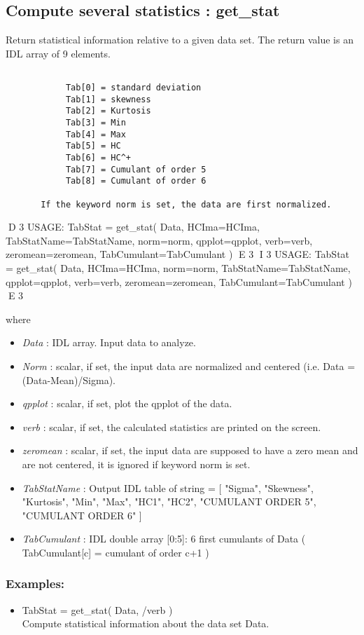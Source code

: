 \subsection{Compute several statistics : get\_stat}
Return statistical information relative to a given data set. The return value is an IDL array of 9 elements.
\begin{verbatim}

			Tab[0] = standard deviation
			Tab[1] = skewness
			Tab[2] = Kurtosis
			Tab[3] = Min
			Tab[4] = Max 
			Tab[5] = HC
			Tab[6] = HC^+
			Tab[7] = Cumulant of order 5
			Tab[8] = Cumulant of order 6

       If the keyword norm is set, the data are first normalized.
\end{verbatim}
{\bf
\begin{center}
D 3
     USAGE: TabStat = get\_stat( Data, HCIma=HCIma, TabStatName=TabStatName, norm=norm, qpplot=qpplot, verb=verb, zeromean=zeromean, TabCumulant=TabCumulant )  
E 3
I 3
     USAGE: TabStat = get\_stat( Data, HCIma=HCIma, norm=norm, TabStatName=TabStatName, qpplot=qpplot, verb=verb, zeromean=zeromean, TabCumulant=TabCumulant )  
E 3
\end{center}}
where 
\begin{itemize}
\item {\em Data} : IDL array. Input data to analyze. 
\item {\em Norm} : scalar, if set, the input data are normalized and centered (i.e. Data = (Data-Mean)/Sigma).  
\item {\em qpplot} : scalar, if set, plot the qpplot of the data.
\item {\em verb} : scalar, if set, the calculated statistics are printed on the screen.
\item {\em zeromean} : scalar, if set, the input data are supposed to have a zero mean and are not centered, it is ignored if keyword norm is set.
\item {\em TabStatName} : Output IDL table of string = [ "Sigma", "Skewness", "Kurtosis", "Min", "Max", "HC1", "HC2", "CUMULANT ORDER 5", "CUMULANT ORDER 6" ]
\item {\em TabCumulant} : IDL double array [0:5]: 6 first cumulants of Data  ( TabCumulant[c] = cumulant of order c+1 )
\end{itemize}

\subsubsection*{Examples:} 
\begin{itemize}
\item TabStat = get\_stat( Data, /verb )  \\
Compute statistical information about the data set Data.
\end{itemize}



